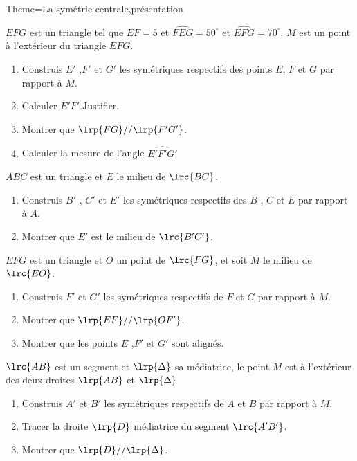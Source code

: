 \documentclass[a4paper,12pt]{article}
\begin{document}
\begin{Maquette}[Fiche]{Theme=La symétrie centrale,présentation}
\begin{exercice}%
$EFG$ est un triangle tel que $EF=5$ et $\widehat{FEG}=50^{\circ}$ et $\widehat{EFG}=70^{\circ}$. $M$ est un point à l'extérieur  du triangle $EFG$.
\begin{enumerate}
\item Construis $E'$ ,$F'$ et $G'$ les symétriques respectifs des points $E$, $F$ et $G$ par rapport à $M$.
\item Calculer $E'F'$.Justifier.
\item Montrer que $\lrp{FG}// \lrp{F'G'}$.
\item Calculer la mesure de l'angle $\widehat{E'F'G'}$
\end{enumerate}
\end{exercice}

\begin{exercice}%
$ABC$ est un triangle et $E$ le milieu de $\lrc{BC}$.
\begin{enumerate}
\item Construis $B'$ , $C'$ et $E'$ les symétriques respectifs des $B$ , $C$ et $E$ par rapport à $A$.
\item Montrer que $E'$ est le milieu de $\lrc{B'C'}$.
\end{enumerate}
\end{exercice}

\begin{exercice}%
$EFG$ est un triangle et $O$ un point de $\lrc{FG}$, et soit $M$ le milieu de $\lrc{EO}$.
\begin{enumerate}
\item Construis $F'$ et $G'$ les symétriques respectifs de $F$ et $G$ par rapport à $M$.
\item Montrer que $\lrp{EF}//\lrp{OF'}$.
\item Montrer que les points $E$ ,$F'$ et $G'$ sont alignés.
\end{enumerate}
\end{exercice}

\begin{exercice}%
$\lrc{AB}$ est un segment et $\lrp{\Delta}$ sa médiatrice, le point $M$ est à l'extérieur des deux droites $\lrp{AB}$ et $\lrp{\Delta}$
\begin{enumerate}
\item Construis $A'$ et $B'$ les symétriques respectifs de $A$ et $B$ par rapport à $M$.
\item Tracer la droite $\lrp{D}$ médiatrice du segment $\lrc{A'B'}$.
\item Montrer que $\lrp{D} //\lrp{\Delta}$.
\end{enumerate}
\end{exercice}


\end{Maquette}
\end{document}
